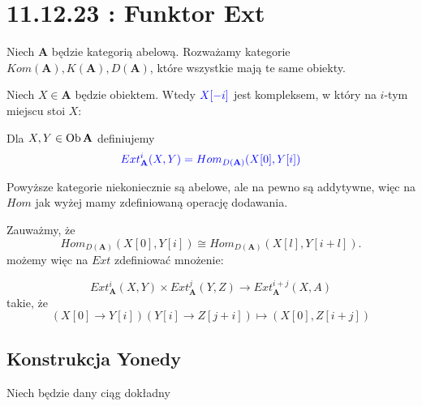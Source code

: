\section{11.12.23 : Funktor Ext}
 
\begin{definition}
  Niech $\mathbf{A}$ będzie kategorią abelową. Rozważamy kategorie $Kom(\mathbf{A}), K(\mathbf{A}), D(\mathbf{A})$, które wszystkie mają te same obiekty.

  Niech $X\in\mathbf{A}$ będzie obiektem. Wtedy $\color{blue}X[-i]$ jest kompleksem, w który na $i$-tym miejscu stoi $X$:
  \begin{center}\end{center}

  Dla $X,Y\in\operatorname{Ob}\mathbf{A}$ definiujemy
  $$\color{blue}Ext_{\mathbf{A}}^i(X, Y)=Hom_{D(\mathbf{A})}(X[0], Y[i])$$
\end{definition}

Powyższe kategorie niekoniecznie są abelowe, ale na pewno są addytywne, więc na $Hom$ jak wyżej mamy zdefiniowaną operację dodawania.

Zauważmy, że
$$Hom_{D(\mathbf{A})}(X[0], Y[i])\cong Hom_{D(\mathbf{A})}(X[l], Y[i+l]).$$
możemy więc na $Ext$ zdefiniować mnożenie:
\begin{definition}
  $$Ext_{\mathbf{A}}^i(X, Y)\times Ext_{\mathbf{A}}^j(Y, Z)\xrightarrow{} Ext_{\mathbf{A}}^{i+j}(X, A)$$
  takie, że
  $$(X[0]\to Y[i])(Y[i]\to Z[j+i])\mapsto(X[0], Z[i+j])$$
\end{definition}

\subsection{Konstrukcja Yonedy}

Niech będzie dany ciąg dokładny
\begin{center}\end{center}

